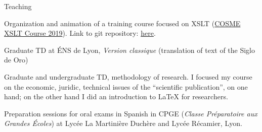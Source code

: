 










\begin{rubric}{Teaching}
                                \entry*[2018-2019]
                                
                            Organization and animation of a training course focused on XSLT (\href{https://cosme.hypotheses.org/1117}{COSME XSLT Course 2019}).
                        Link to git repository: \href{https://github.com/gabays/Cours\_COSME\_2019}{here}.
                    
                                \entry*
                            Graduate TD at ÉNS de Lyon, \textit{Version classique}
                        (translation of text of the Siglo de Oro)
                    
                                \entry*
                            Graduate and undergraduate TD, methodology of research. I focused my
                        course on the economic, juridic, technical issues of the \enquote{scientific
                        publication}, on one hand; on the other hand I did an introduction to
                        LaTeX for researchers.
                    
                                \entry*[2017-2018]
                                
                            Preparation sessions for oral exams in Spanish in CPGE (\textit{Classe
                        Préparatoire aux Grandes Écoles}) at Lycée La Martinière Duchère and
                        Lycée Récamier, Lyon.
                    \end{rubric}


